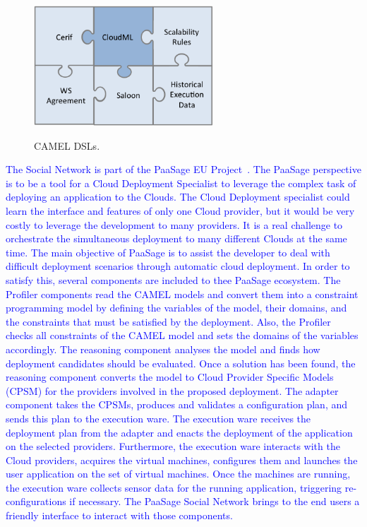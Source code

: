 \begin{figure}[h]
	\caption{CAMEL DSLs.}
	\includegraphics[width=0.6\textwidth,natwidth=200,natheight=150]{./fig/dsl.png}
	\centering
	\label{fig:dsls}
\end{figure}

\textcolor{blue}{The Social Network is part of the PaaSage EU Project~\cite{paasage}.
The PaaSage perspective is to be a tool for a Cloud Deployment Specialist to leverage the complex task of deploying an application to the Clouds. The Cloud Deployment specialist could learn the interface and features of only one Cloud provider, but it would be very costly to leverage the development to many providers. It is a real challenge to orchestrate the simultaneous deployment to many different Clouds at the same time. The main objective of PaaSage is to assist the developer to deal with difficult deployment scenarios through automatic cloud deployment. In order to satisfy this, several components are included to thee PaaSage ecosystem. The Profiler components read the CAMEL models and convert them into a constraint programming model by defining the variables of the model, their domains, and the constraints that must be satisfied by the deployment. Also, the Profiler checks all constraints of the CAMEL model and sets the domains of the variables accordingly. The reasoning component analyses the model and finds how deployment candidates should be evaluated. Once a solution has been found, the reasoning component converts the model to Cloud Provider Specific Models (CPSM) for the providers involved in the proposed deployment. The adapter component takes the CPSMs, produces and validates a configuration plan, and sends this plan to the execution ware. The execution ware receives the deployment plan from the adapter and enacts the deployment of the application on the selected providers. Furthermore, the execution ware interacts with the Cloud providers, acquires the virtual machines, configures them and launches the user application on the set of virtual machines. Once the machines are running, the execution ware collects sensor data for the running application, triggering re-configurations if necessary.}
\textcolor{blue}{The PaaSage Social Network brings to the end users a friendly interface to interact with those components.}




